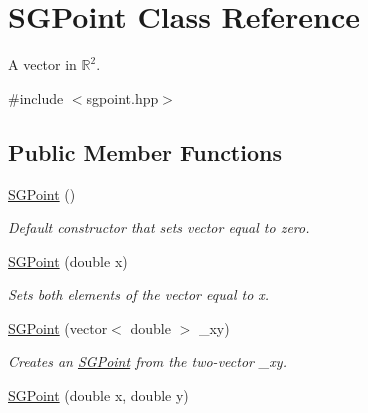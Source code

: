 \hypertarget{classSGPoint}{\section{S\-G\-Point Class Reference}
\label{classSGPoint}
}


A vector in $\mathbb{R}^2$.  




{\ttfamily \#include $<$sgpoint.\-hpp$>$}

\subsection*{Public Member Functions}
\begin{DoxyCompactItemize}
\item 
\hypertarget{classSGPoint_aa8127de54b9fae207ca43a60414a3dd8}{\hyperlink{classSGPoint_aa8127de54b9fae207ca43a60414a3dd8}{S\-G\-Point} ()}\label{classSGPoint_aa8127de54b9fae207ca43a60414a3dd8}

\begin{DoxyCompactList}\small\item\em Default constructor that sets vector equal to zero. \end{DoxyCompactList}\item 
\hypertarget{classSGPoint_a3b415d48aa231cc30a49ba9aeca35665}{\hyperlink{classSGPoint_a3b415d48aa231cc30a49ba9aeca35665}{S\-G\-Point} (double x)}\label{classSGPoint_a3b415d48aa231cc30a49ba9aeca35665}

\begin{DoxyCompactList}\small\item\em Sets both elements of the vector equal to x. \end{DoxyCompactList}\item 
\hypertarget{classSGPoint_a02473a7c780510203156728286a9eefc}{\hyperlink{classSGPoint_a02473a7c780510203156728286a9eefc}{S\-G\-Point} (vector$<$ double $>$ \-\_\-xy)}\label{classSGPoint_a02473a7c780510203156728286a9eefc}

\begin{DoxyCompactList}\small\item\em Creates an \hyperlink{classSGPoint}{S\-G\-Point} from the two-\/vector \-\_\-xy. \end{DoxyCompactList}\item 
\hypertarget{classSGPoint_a283f1dedd05d7f74c570625ff234892e}{\hyperlink{classSGPoint_a283f1dedd05d7f74c570625ff234892e}{S\-G\-Point} (double x, double y)}\label{classSGPoint_a283f1dedd05d7f74c570625ff234892e}


\end{DoxyCompactItemize}
